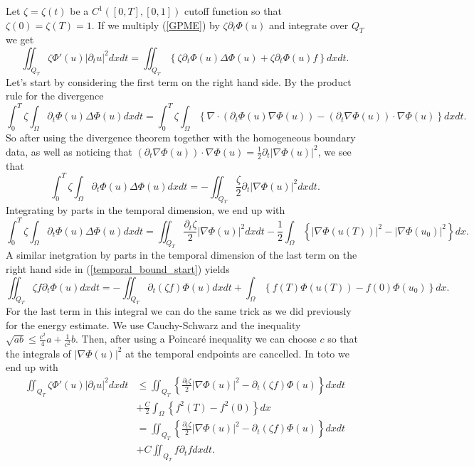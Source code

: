 \documentclass[11pt, a4paper]{article}
\begin{document}
Let $\zeta = \zeta(t)$ be a $C^1([0,T],[0,1])$ cutoff function so that $\zeta(0) = \zeta(T) = 1$. If we multiply (\ref{GPME}) by $\zeta \partial_t\Phi(u)$ and integrate over $Q_T$ we get
	\begin{equation}
	\label{temporal_bound_start}
	\iint_{Q_T}\zeta \Phi'(u)|\partial_t u|^2 dxdt = \iint_{Q_T} \left\{ \zeta \partial_t \Phi(u) \Delta \Phi(u)  + \zeta \partial_t \Phi(u) f \right\} dxdt.
	\end{equation}
	Let's start by considering the first term on the right hand side. By the product rule for the divergence
	\begin{equation*}
	\int_0^T \zeta \int_\Omega \partial_t \Phi(u) \Delta \Phi(u) dxdt = \int_0^T \zeta \int_\Omega \left\{ \nabla \cdot (\partial_t \Phi(u) \nabla \Phi(u)) - (\partial_t \nabla \Phi(u)) \cdot \nabla \Phi(u) \right\} dx dt.
	\end{equation*}
	So after using the divergence theorem together with the homogeneous boundary data, as well as noticing that $(\partial_t \nabla \Phi(u)) \cdot \nabla \Phi(u) = \frac{1}{2}\partial_t |\nabla \Phi(u)|^2$, we see that
	\begin{equation*}
	\int_0^T \zeta \int_\Omega \partial_t \Phi(u) \Delta \Phi(u) dxdt = -\iint_{Q_T}\frac{\zeta}{2}\partial_t |\nabla \Phi(u)|^2 dxdt.
	\end{equation*}
	Integrating by parts in the temporal dimension, we end up with
	\begin{equation*}
	\int_0^T \zeta \int_\Omega \partial_t \Phi(u) \Delta \Phi(u) dxdt = \iint_{Q_T} \frac{\partial_t \zeta}{2} |\nabla \Phi(u)|^2 dxdt - \frac{1}{2}\int_\Omega \left\{ |\nabla \Phi(u(T))|^2 - |\nabla \Phi(u_0)|^2 \right\} dx.
	\end{equation*}
	A similar inetgration by parts in the temporal dimension of the last term on the right hand side in (\ref{temporal_bound_start}) yields
	\begin{equation*}
	\iint_{Q_T} \zeta f \partial_t \Phi(u) dxdt = -\iint_{Q_T} \partial_t (\zeta f) \Phi(u) dxdt + \int_\Omega \left\{ f(T)\Phi(u(T)) - f(0)\Phi(u_0) \right\} dx.
	\end{equation*}
	For the last term in this integral we can do the same trick as we did previously for the energy estimate. We use Cauchy-Schwarz and the inequality $\sqrt{ab} \leq \frac{c^2}{4}a + \frac{1}{c^2}b$. Then, after using a Poincaré inequality we can choose $c$ so that the integrals of $|\nabla \Phi(u)|^2$ at the temporal endpoints are cancelled. In toto we end up with
	\begin{align*}
	\iint_{Q_T} \zeta \Phi'(u) |\partial_t u|^2 dxdt &\leq \iint_{Q_T} \left\{ \frac{\partial_t \zeta}{2}|\nabla \Phi(u)|^2 - \partial_t(\zeta f) \Phi(u) \right\} dxdt \\
	&+ \frac{C}{2}\int_\Omega \left\{ f^2(T) - f^2(0) \right\} dx	\\
	&= \iint_{Q_T} \left\{ \frac{\partial_t \zeta}{2}|\nabla \Phi(u)|^2 - \partial_t(\zeta f) \Phi(u) \right\} dxdt \\
	&+ C \iint_{Q_T} f\partial_t f dxdt.
	\end{align*}
	
\end{document}
